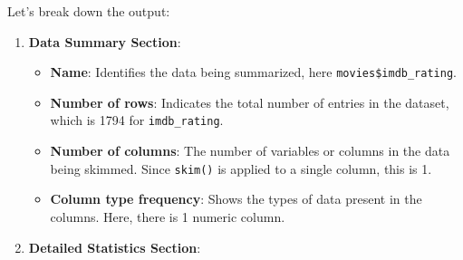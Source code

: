 \documentclass[
]{book}
\newenvironment{Shaded}{\begin{snugshade}}{\end{snugshade}}
\newcommand{\FunctionTok}[1]{\textcolor[rgb]{0.13,0.29,0.53}{\textbf{#1}}}
\newcommand{\NormalTok}[1]{#1}
\newcommand{\SpecialCharTok}[1]{\textcolor[rgb]{0.81,0.36,0.00}{\textbf{#1}}}
\providecommand{\tightlist}{%
  \setlength{\itemsep}{0pt}\setlength{\parskip}{0pt}}
\begin{document}
\begin{Shaded}
\end{Shaded}

Let's break down the output:

\begin{enumerate}
\def\labelenumi{\arabic{enumi}.}
\tightlist
\item
  \textbf{Data Summary Section}:

  \begin{itemize}
  \tightlist
  \item
    \textbf{Name}: Identifies the data being summarized, here \texttt{movies\$imdb\_rating}.
  \item
    \textbf{Number of rows}: Indicates the total number of entries in the dataset, which is 1794 for \texttt{imdb\_rating}.
  \item
    \textbf{Number of columns}: The number of variables or columns in the data being skimmed. Since \texttt{skim()} is applied to a single column, this is 1.
  \item
    \textbf{Column type frequency}: Shows the types of data present in the columns. Here, there is 1 numeric column.
  \end{itemize}
\item
  \textbf{Detailed Statistics Section}:


\end{enumerate}
\end{document}

